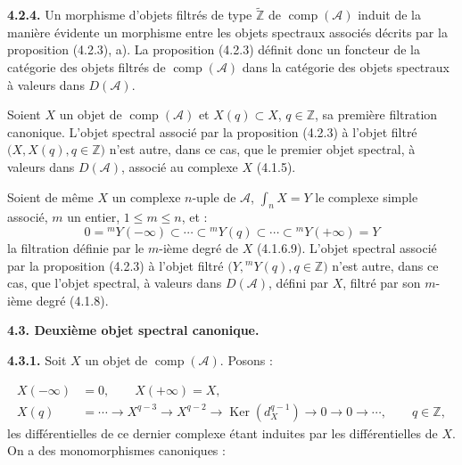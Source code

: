 \clearpage
{}%
\begingroup\small\setlength{\parskip}{0pt}\setlength{\emergencystretch}{1.5em}
\setlength{\abovedisplayskip}{4pt plus 2pt minus 2pt}%
\setlength{\belowdisplayskip}{4pt plus 2pt minus 2pt}%

\noindent\textbf{4.2.4.}\quad
Un morphisme d'objets filtrés de type $\widetilde{\mathbb Z}$ de
$\operatorname{comp}(\mathcal A)$ induit de la manière évidente un
morphisme entre les objets spectraux associés décrits par la proposition
(4.2.3), a). La proposition (4.2.3) définit donc un foncteur de la catégorie
des objets filtrés de $\operatorname{comp}(\mathcal A)$ dans la catégorie
des objets spectraux à valeurs dans $D(\mathcal A)$.

Soient $X$ un objet de $\operatorname{comp}(\mathcal A)$ et
$X(q)\subset X$, $q\in\mathbb Z$, sa première filtration canonique.
L'objet spectral associé par la proposition (4.2.3) à l'objet filtré
$\bigl(X,X(q),q\in\mathbb Z\bigr)$ n'est autre, dans ce cas, que le premier
objet spectral, à valeurs dans $D(\mathcal A)$, associé au complexe $X$
(4.1.5).

Soient de même $X$ un complexe $n$-uple de $\mathcal A$,
$\int_n X=Y$ le complexe simple associé, $m$ un entier,
$1\leq m\leq n$, et :
\[
0={}^{m}\!Y(-\infty)\subset\cdots\subset{}^{m}\!Y(q)
\subset\cdots\subset{}^{m}\!Y(+\infty)=Y
\]
la filtration définie par le $m$-ième degré de $X$ (4.1.6.9). L'objet
spectral associé par la proposition (4.2.3) à l'objet filtré
$\bigl(Y,{}^{m}\!Y(q),q\in\mathbb Z\bigr)$ n'est autre, dans ce cas, que
l'objet spectral, à valeurs dans $D(\mathcal A)$, défini par $X$, filtré
par son $m$-ième degré (4.1.8).

\medskip\noindent\textbf{4.3. Deuxième objet spectral canonique.}

\medskip\noindent\textbf{4.3.1.}\quad
Soit $X$ un objet de $\operatorname{comp}(\mathcal A)$. Posons :

\begin{equation}
\begin{aligned}
X(-\infty)&=0,\qquad X(+\infty)=X,\\
X(q)&=\cdots\longrightarrow X^{q-3}\longrightarrow X^{q-2}
\longrightarrow\operatorname{Ker}(d_X^{q-1})
\longrightarrow0\longrightarrow0\longrightarrow\cdots,
\qquad q\in\mathbb Z,
\end{aligned}
\tag{4.3.1.1}
\end{equation}
les différentielles de ce dernier complexe étant induites par les
différentielles de $X$. On a des monomorphismes canoniques :

